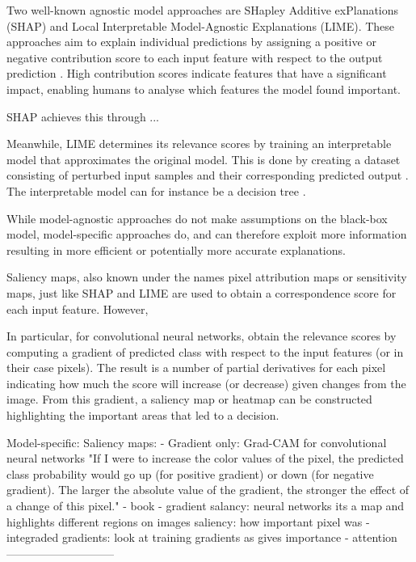 Two well-known agnostic model approaches are SHapley Additive exPlanations (SHAP) and Local Interpretable Model-Agnostic Explanations (LIME). These approaches aim to explain individual predictions by assigning a positive or negative contribution score to each input feature with respect to the output prediction \cite{lundbergUnifiedApproachInterpreting2017, molnarInterpretableMachineLearning2022}. High contribution scores indicate features that have a significant impact, enabling humans to analyse which features the model found important.

SHAP achieves this through ... %

Meanwhile, LIME determines its relevance scores by training an interpretable model that approximates the original model. This is done by creating a dataset consisting of perturbed input samples and their corresponding predicted output  \citep{ribeiroWhyShouldTrust2016}. The interpretable model can for instance be a decision tree \citep{molnarInterpretableMachineLearning2022}.

While model-agnostic approaches do not make assumptions on the black-box model, model-specific approaches do, and can therefore exploit more information resulting in more efficient or potentially more accurate explanations.

Saliency maps, also known under the names pixel attribution maps or sensitivity maps, just like SHAP and LIME are used to obtain a correspondence score for each input feature. However,

In particular, for convolutional neural networks, \cite{simonyanDeepConvolutionalNetworks2014} obtain the relevance scores by computing a gradient of predicted class with respect to the input features (or in their case pixels). The result is a number of partial derivatives for each pixel indicating how much the score will increase (or decrease) given changes from the image. From this gradient, a saliency map or heatmap can be constructed highlighting the important areas that led to a decision. 




Model-specific:
Saliency maps:
- Gradient only: Grad-CAM for convolutional neural networks "If I were to increase the color values of the pixel, the predicted class probability would go up (for positive gradient) or down (for negative gradient). The larger the absolute value of the gradient, the stronger the effect of a change of this pixel." - book
- gradient salancy: neural networks
its a map and highlights different regions on images
saliency: how important pixel was
- integraded gradients: look at training gradients as gives importance
- attention
-----------------------------















